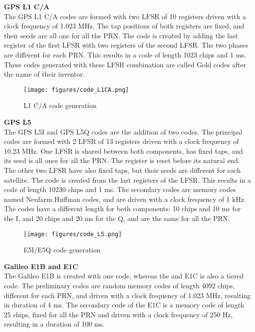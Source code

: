 \documentclass[openany,10pt,twoside,a4paper]{book}
\begin{document}
\noindent
\textbf{GPS L1 C/A} \\
The GPS L1 C/A codes are formed with two LFSR of 10 registers driven with a clock frequency of 1.023 MHz. The tap positions of both registers are fixed, and their seeds are all one for all the PRN. The code is created by adding the last register of the first LFSR with two registers of the second LFSR. The two phases are different for each PRN. This results in a code of length 1023 chips and 1 ms. These codes generated with these LFSR combination are called Gold codes after the name of their inventor. \newline
\begin{figure}[tb]
\centering
\texttt{[image: figures/code\_L1CA.png]}
\caption{L1 C/A code generation}
\label{fig:code_CA}
\end{figure}

\noindent
\textbf{GPS L5} \\
The GPS L5I and GPS L5Q codes are the addition of two codes. The principal codes are formed with 2 LFSR of 13 registers driven with a clock frequency of 10.23 MHz. One LFSR  is shared between both components, has fixed taps, and its seed is all ones for all the PRN. The register is reset before its natural end. The other two LFSR have also fixed taps, but their seeds are different for each satellite. The code is created from the last registers of the LFSR. This results in a code of length 10230 chips and 1 ms. The secondary codes are memory codes named Neufarm Huffman codes, and are driven with a clock frequency of 1 kHz. The codes have a different length for both components: 10 chips and 10 ms for the I, and 20 chips and 20 ms for the Q, and are the same for all the PRN. \newline
\begin{figure}[tb]
\centering
\texttt{[image: figures/code\_L5.png]}
\caption{E5I/E5Q code generation}
\label{fig:code_L5}
\end{figure}

\noindent
\textbf{Galileo E1B and E1C} \\
The Galileo E1B is created with one code, whereas the and E1C is also a tiered code. The preliminary codes are random memory codes of length 4092 chips, different for each PRN, and driven with a clock frequency of 1.023 MHz, resulting in duration of 4 ms. The secondary code of the E1C is a memory code of length 25 chips, fixed for all the PRN and driven with a clock frequency of 250 Hz, resulting in a duration of 100 ms. \newline
\end{document}
